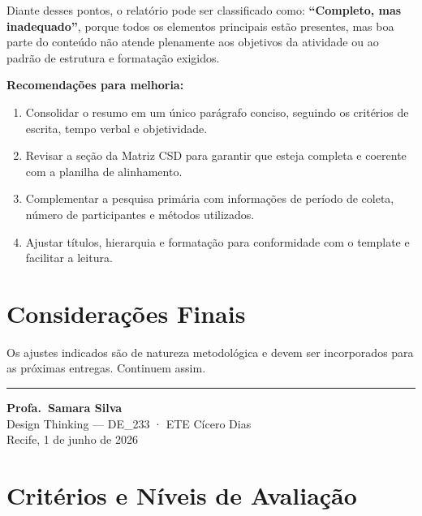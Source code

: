 \documentclass[
  sigconf,
  nonacm, %
  language=portuguese
]{acmart}
\begin{document}
Diante desses pontos, o relatório pode ser classificado como: \textbf{“Completo, mas inadequado”}, porque todos os elementos principais estão presentes, mas boa parte do conteúdo não atende plenamente aos objetivos da atividade ou ao padrão de estrutura e formatação exigidos.

\textbf{Recomendações para melhoria:}

\begin{enumerate}[leftmargin=14pt,itemsep=2pt,topsep=4pt]
  \item Consolidar o resumo em um único parágrafo conciso, seguindo os critérios de escrita, tempo verbal e objetividade.
  \item Revisar a seção da Matriz CSD para garantir que esteja completa e coerente com a planilha de alinhamento.
  \item Complementar a pesquisa primária com informações de período de coleta, número de participantes e métodos utilizados.
  \item Ajustar títulos, hierarquia e formatação para conformidade com o template e facilitar a leitura.
\end{enumerate}

\section{Considerações Finais}

Os ajustes indicados são de natureza metodológica e devem ser
incorporados para as próximas entregas.
Continuem assim.


\vspace{1.5em}
\noindent\rule{\linewidth}{0.4pt}

\begin{flushright}
\textbf{Profa.\ Samara Silva}\\
{\small\color{cmuted} Design Thinking --- DE\_233 · ETE Cícero Dias}\\
{\small\color{cmuted} Recife, 1 de junho de 2026}
\end{flushright}


\appendix
\onecolumn
\section{Critérios e Níveis de Avaliação}
\end{document}
